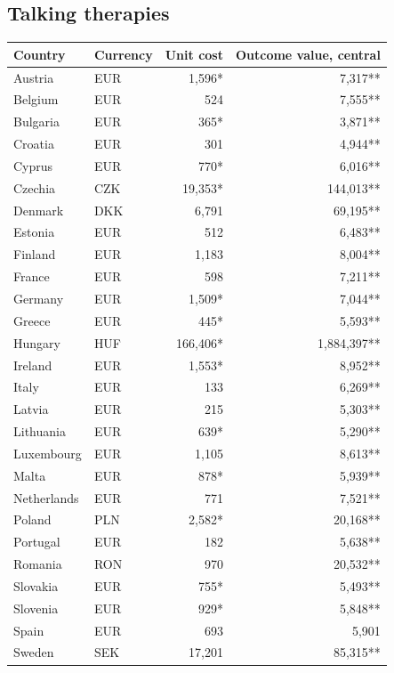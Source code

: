 \subsection*{Talking therapies}
\begin{longtable}{llrr}
\toprule
Country & Currency & Unit cost & Outcome value, central \\
\midrule
\endhead
Austria & EUR & 1,596* & 7,317** \\
Belgium & EUR & 524 & 7,555** \\
Bulgaria & EUR & 365* & 3,871** \\
Croatia & EUR & 301 & 4,944** \\
Cyprus & EUR & 770* & 6,016** \\
Czechia & CZK & 19,353* & 144,013** \\
Denmark & DKK & 6,791 & 69,195** \\
Estonia & EUR & 512 & 6,483** \\
Finland & EUR & 1,183 & 8,004** \\
France & EUR & 598 & 7,211** \\
Germany & EUR & 1,509* & 7,044** \\
Greece & EUR & 445* & 5,593** \\
Hungary & HUF & 166,406* & 1,884,397** \\
Ireland & EUR & 1,553* & 8,952** \\
Italy & EUR & 133 & 6,269** \\
Latvia & EUR & 215 & 5,303** \\
Lithuania & EUR & 639* & 5,290** \\
Luxembourg & EUR & 1,105 & 8,613** \\
Malta & EUR & 878* & 5,939** \\
Netherlands & EUR & 771 & 7,521** \\
Poland & PLN & 2,582* & 20,168** \\
Portugal & EUR & 182 & 5,638** \\
Romania & RON & 970 & 20,532** \\
Slovakia & EUR & 755* & 5,493** \\
Slovenia & EUR & 929* & 5,848** \\
Spain & EUR & 693 & 5,901 \\
Sweden & SEK & 17,201 & 85,315** \\
\bottomrule
\end{longtable}
